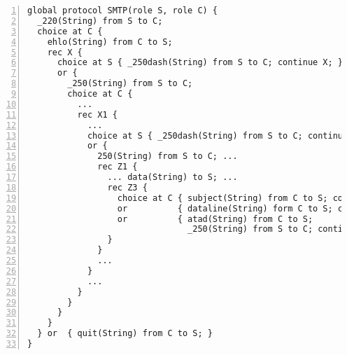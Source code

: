 \begin{lstlisting}[numbers=left]
global protocol SMTP(role S, role C) {
  _220(String) from S to C;
  choice at C {
    ehlo(String) from C to S;
    rec X {
      choice at S { _250dash(String) from S to C; continue X; }
      or {
        _250(String) from S to C;
        choice at C {
          ...
          rec X1 {
            ...
            choice at S { _250dash(String) from S to C; continue X1; }
            or {
              250(String) from S to C; ...
              rec Z1 {
                ... data(String) to S; ...
                rec Z3 {
                  choice at C { subject(String) from C to S; continue Z3;  }
                  or          { dataline(String) form C to S; continue Z3; }
                  or          { atad(String) from C to S;
                                _250(String) from S to C; continue Z1;     }
                }
              }
              ...  
            }  
            ... 
          }
        }
      }
    }
  } or  { quit(String) from C to S; }
}
\end{lstlisting}


